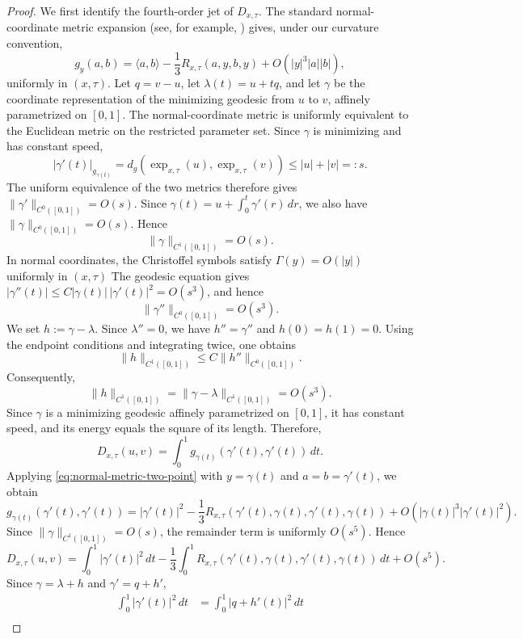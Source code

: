 \documentclass[11pt]{article}
\theoremstyle{remark}
\numberwithin{equation}{section}
\begin{document}
\begin{proof}
We first identify the fourth-order jet of $D_{x,\tau}$.  The standard
normal-coordinate
metric expansion (see, for example, \cite{Gray2004,Chavel2006,Petersen2016})
gives, under our curvature convention,
\begin{equation}
 g_y(a,b)=\langle a,b\rangle
 -\frac13R_{x,\tau}(a,y,b,y)
 +O(|y|^3|a||b|),
 \label{eq:normal-metric-two-point}
\end{equation}
uniformly in $(x,\tau)$. 
Let $q=v-u$, let $\lambda(t)=u+tq$, and let $\gamma$ be
the coordinate representation of the minimizing geodesic from $u$ to $v$, affinely parametrized on $[0,1]$. 
The normal-coordinate metric is uniformly equivalent to the Euclidean
metric on the restricted parameter set.  Since $\gamma$ is minimizing and
has constant speed,
\[
|\gamma'(t)|_{g_{\gamma(t)}}
=
d_g\!\left(\exp_{x,\tau}(u),\exp_{x,\tau}(v)\right)
\le |u|+|v|=:s.
\]
The uniform equivalence of the two metrics therefore gives
$\|\gamma'\|_{C^0([0,1])}=O(s)$.
Since $\gamma(t)
=
u+\int_0^t\gamma'(r)\,dr$,
we also have
$\|\gamma\|_{C^0([0,1])}=O(s)$.
Hence
\[
\|\gamma\|_{C^1([0,1])}=O(s).
\] 
In normal coordinates, the Christoffel symbols satisfy
$\Gamma(y)=O(|y|)$ uniformly in $(x,\tau)$
The geodesic equation gives
$|\gamma''(t)|
\le
C|\gamma(t)|\,|\gamma'(t)|^2
=
O(s^3)$,
and hence
\[
\|\gamma''\|_{C^0([0,1])}=O(s^3).
\]
We set $h:=\gamma-\lambda$.
Since $\lambda''=0$, we have $h''=\gamma''$ and $h(0)=h(1)=0$.
Using the endpoint conditions and integrating twice, one obtains
\[
\|h\|_{C^1([0,1])}
\le
C\|h''\|_{C^0([0,1])}.
\]
Consequently,
\[
\|h\|_{C^1([0,1])}
=
\|\gamma-\lambda\|_{C^1([0,1])}
=
O(s^3).
\]
Since $\gamma$ is a minimizing geodesic affinely parametrized on $[0,1]$,
it has constant speed, and its energy equals the square of its length.
Therefore,
\[
D_{x,\tau}(u,v)
=
\int_0^1
g_{\gamma(t)}\!\left(\gamma'(t),\gamma'(t)\right)\,dt.
\]
Applying \eqref{eq:normal-metric-two-point} with
$y=\gamma(t)$ and $a=b=\gamma'(t)$,
we obtain
\[
g_{\gamma(t)}\!\left(\gamma'(t),\gamma'(t)\right)
=
|\gamma'(t)|^2
-\frac13
R_{x,\tau}\!\left(
\gamma'(t),\gamma(t),\gamma'(t),\gamma(t)
\right)+O\!\left(
|\gamma(t)|^3|\gamma'(t)|^2
\right).
\]
Since $\|\gamma\|_{C^1([0,1])}=O(s)$,
the remainder term is uniformly $O(s^5)$.  Hence
\[
D_{x,\tau}(u,v)
=
\int_0^1|\gamma'(t)|^2\,dt-\frac13\int_0^1
R_{x,\tau}\!\left(
\gamma'(t),\gamma(t),\gamma'(t),\gamma(t)
\right)\,dt
+O(s^5).
\]
Since $\gamma=\lambda+h$ and $\gamma'=q+h'$,
\[
\begin{aligned}
\int_0^1|\gamma'(t)|^2\,dt
&=
\int_0^1|q+h'(t)|^2\,dt\\

\end{aligned}\]
\end{proof}
\end{document}
